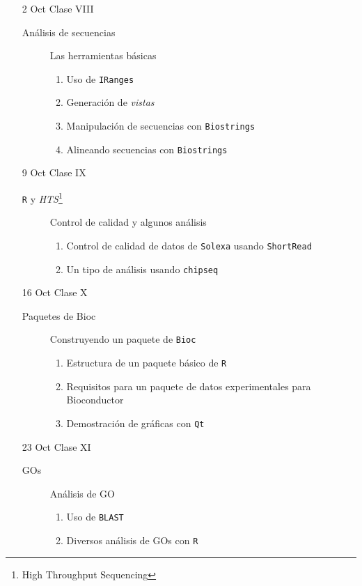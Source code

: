\documentclass[letterpaper,12pt]{article}
\newcommand{\pl}[1]{\texttt{#1}}
\begin{document}
\begin{itemize}
  \item[2 Oct] Clase VIII
  \begin{description}
  \item[Análisis de secuencias] Las herramientas básicas
  \begin{enumerate}
  \item Uso de \pl{IRanges}
  \item Generación de \emph{vistas}
  \item Manipulación de secuencias con \pl{Biostrings}
  \item Alineando secuencias con \pl{Biostrings}
  \end{enumerate}
  \end{description}
  
  \item[9 Oct] Clase IX
  \begin{description}
  \item[\pl{R} y \emph{HTS}\footnote{High Throughput Sequencing}] Control de calidad y algunos análisis
    \begin{enumerate}
      \item Control de calidad de datos de \pl{Solexa} usando \pl{ShortRead}
      \item Un tipo de análisis usando \pl{chipseq}
    \end{enumerate}
  \end{description}
  
  \item[16 Oct] Clase X
  \begin{description}
  \item[Paquetes de Bioc] Construyendo un paquete de \pl{Bioc}
  \begin{enumerate}
  \item Estructura de un paquete básico de \pl{R}
  \item Requisitos para un paquete de datos experimentales para Bioconductor
  \item Demostración de gráficas con \pl{Qt}
  \end{enumerate}
  \end{description}
  
  \item[23 Oct] Clase XI
  \begin{description}
  \item[GOs] Análisis de GO
  \begin{enumerate}
  \item Uso de \pl{BLAST}
  \item Diversos análisis de GOs con \pl{R}
  \end{enumerate}
  \end{description}  
  

\end{itemize}
\end{document}
